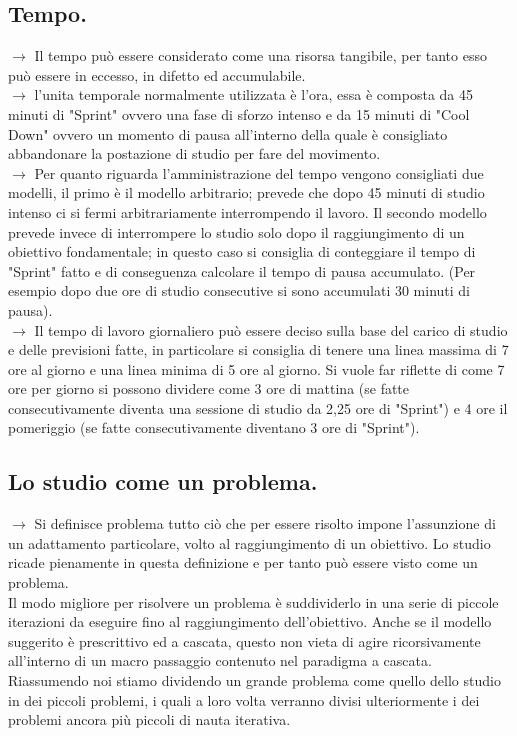\documentclass[11pt,a4paper]{article}
\begin{document}
\subsection{Tempo.}
$\rightarrow$ Il tempo può essere considerato come una risorsa tangibile, per tanto esso può essere in eccesso, in difetto ed accumulabile.\\
$\rightarrow$ l'unita temporale normalmente utilizzata è l'ora, essa è composta da 45 minuti di "Sprint" ovvero una fase di sforzo intenso e da 15 minuti di "Cool Down" ovvero un momento di pausa all'interno della quale è consigliato abbandonare la postazione di studio per fare del movimento. \\
$\rightarrow$ Per quanto riguarda l'amministrazione del tempo vengono consigliati due modelli, il primo è il  modello arbitrario; prevede che dopo 45 minuti di studio intenso ci si fermi arbitrariamente interrompendo il lavoro. Il secondo modello prevede invece di interrompere lo studio solo dopo il raggiungimento di un obiettivo fondamentale; in questo caso si consiglia di conteggiare il tempo di "Sprint" fatto e di conseguenza calcolare il tempo di pausa accumulato. (Per esempio dopo due ore di studio consecutive si sono accumulati 30 minuti di pausa).\\
$\rightarrow$ Il tempo di lavoro giornaliero può essere deciso sulla base del carico di studio e delle previsioni fatte, in particolare si consiglia di tenere una linea massima di 7 ore al giorno e una linea minima di 5 ore al giorno. Si vuole far riflette di come 7 ore per giorno si possono dividere come 3 ore di mattina (se fatte consecutivamente diventa una sessione di studio da 2,25 ore di "Sprint") e 4 ore il pomeriggio (se fatte consecutivamente diventano 3 ore di "Sprint").\\

\subsection{Lo studio come un problema.} 
$\rightarrow$ Si definisce problema tutto ciò che per essere risolto impone l'assunzione di un adattamento particolare, volto al raggiungimento di un obiettivo. Lo studio ricade pienamente in questa definizione e per tanto può essere visto come un problema.\\
Il modo migliore per risolvere un problema è suddividerlo in una serie di piccole iterazioni da eseguire fino al raggiungimento dell'obiettivo. Anche se il modello suggerito è prescrittivo ed a cascata, questo non vieta di agire ricorsivamente all'interno di un macro passaggio contenuto nel paradigma a cascata.\\
Riassumendo noi stiamo dividendo un grande problema come quello dello studio in dei piccoli problemi, i quali a loro volta verranno divisi ulteriormente i dei problemi ancora più piccoli di nauta iterativa.\\ 
\end{document}
